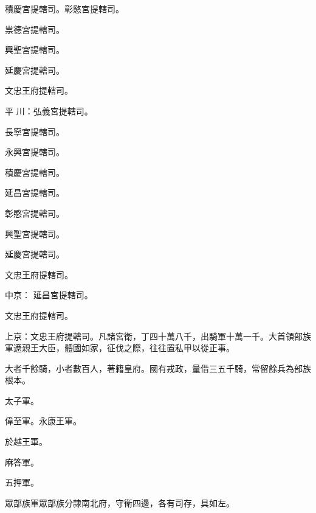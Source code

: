 \begin{pinyinscope}
 積慶宮提轄司。彰愍宮提轄司。



 祟德宮提轄司。



 興聖宮提轄司。



 延慶宮提轄司。



 文忠王府提轄司。



 平
 川：弘義宮提轄司。



 長寧宮提轄司。



 永興宮提轄司。



 積慶宮提轄司。



 延昌宮提轄司。



 彰愍宮提轄司。



 興聖宮提轄司。



 延慶宮提轄司。



 文忠王府提轄司。



 中京：
 延昌宮提轄司。



 文忠王府提轄司。



 上京：文忠王府提轄司。凡諸宮衛，丁四十萬八千，出騎軍十萬一千。大首領部族軍遼親王大臣，體國如家，征伐之際，往往置私甲以從正事。



 大者千餘騎，小者數百人，著籍皇府。國有戎政，量借三五千騎，常留餘兵為部族根本。



 太子軍。



 偉至軍。永康王軍。



 於越王軍。



 麻答軍。



 五押軍。



 眾部族軍眾部族分隸南北府，守衛四邊，各有司存，具如左。




\end{pinyinscope}
